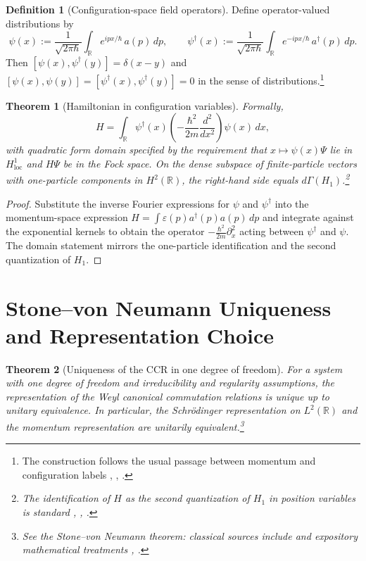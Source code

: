\documentclass[11pt]{article}
\theoremstyle{definition}
\newtheorem{definition}{Definition}
\theoremstyle{plain}
\newtheorem{theorem}{Theorem}
\numberwithin{equation}{section}
\begin{document}
\begin{definition}[Configuration-space field operators]
Define operator-valued distributions by
\[
\psi(x):=\frac{1}{\sqrt{2\pi\hbar}}\int_{\mathbb{R}}e^{ipx/\hbar}\,a(p)\,dp,\qquad
\psi^\dagger(x):=\frac{1}{\sqrt{2\pi\hbar}}\int_{\mathbb{R}}e^{-ipx/\hbar}\,a^\dagger(p)\,dp.
\]
Then $[\psi(x),\psi^\dagger(y)]=\delta(x-y)$ and $[\psi(x),\psi(y)]=[\psi^\dagger(x),\psi^\dagger(y)]=0$ in the sense of distributions.\footnote{The construction follows the usual passage between momentum and configuration labels \cite[Sec.~1.4]{uiuc561}, \cite{scholarpedia}, \cite[Sec.~4.3]{libresecond}.}
\end{definition}

\begin{theorem}[Hamiltonian in configuration variables]
Formally,
\[
H=\int_{\mathbb{R}} \psi^\dagger(x)\left(-\frac{\hbar^2}{2m}\frac{d^2}{dx^2}\right)\psi(x)\,dx,
\]
with quadratic form domain specified by the requirement that $x\mapsto \psi(x)\Psi$ lie in $H^1_{\mathrm{loc}}$ and $H\Psi$ be in the Fock space. On the dense subspace of finite-particle vectors with one-particle components in $H^2(\mathbb{R})$, the right-hand side equals $d\Gamma(H_1)$.\footnote{The identification of $H$ as the second quantization of $H_1$ in position variables is standard \cite[Sec.~1.4]{uiuc561}, \cite{scholarpedia}, \cite[Sec.~4.3]{libresecond}.}
\end{theorem}

\begin{proof}
Substitute the inverse Fourier expressions for $\psi$ and $\psi^\dagger$ into the momentum-space expression $H=\int \varepsilon(p)a^\dagger(p)a(p)\,dp$ and integrate against the exponential kernels to obtain the operator $-\frac{\hbar^2}{2m}\partial_x^2$ acting between $\psi^\dagger$ and $\psi$. The domain statement mirrors the one-particle identification and the second quantization of $H_1$.\end{proof}

\section{Stone--von Neumann Uniqueness and Representation Choice}

\begin{theorem}[Uniqueness of the CCR in one degree of freedom]
For a system with one degree of freedom and irreducibility and regularity assumptions, the representation of the Weyl canonical commutation relations is unique up to unitary equivalence. In particular, the Schr\"odinger representation on $L^2(\mathbb{R})$ and the momentum representation are unitarily equivalent.\footnote{See the Stone--von Neumann theorem: classical sources include \cite{svn-wiki} and expository mathematical treatments \cite{svnhistory}, \cite{summerssvn}.}
\end{theorem}
\end{document}
